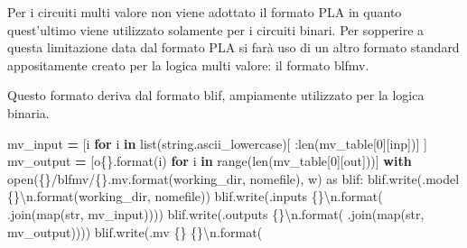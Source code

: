 \documentclass[
  italian,
]{book}
\newenvironment{Shaded}{\begin{snugshade}}{\end{snugshade}}
\newcommand{\BuiltInTok}[1]{#1}
\newcommand{\CharTok}[1]{\textcolor[rgb]{0.31,0.60,0.02}{#1}}
\newcommand{\ControlFlowTok}[1]{\textcolor[rgb]{0.13,0.29,0.53}{\textbf{#1}}}
\newcommand{\DecValTok}[1]{\textcolor[rgb]{0.00,0.00,0.81}{#1}}
\newcommand{\ImportTok}[1]{#1}
\newcommand{\KeywordTok}[1]{\textcolor[rgb]{0.13,0.29,0.53}{\textbf{#1}}}
\newcommand{\NormalTok}[1]{#1}
\newcommand{\OperatorTok}[1]{\textcolor[rgb]{0.81,0.36,0.00}{\textbf{#1}}}
\newcommand{\SpecialCharTok}[1]{\textcolor[rgb]{0.00,0.00,0.00}{#1}}
\newcommand{\StringTok}[1]{\textcolor[rgb]{0.31,0.60,0.02}{#1}}
\begin{document}
Per i circuiti multi valore non viene adottato il formato PLA in quanto quest'ultimo viene utilizzato solamente per i circuiti binari. Per sopperire a questa limitazione data dal formato PLA si farà uso di un altro formato standard appositamente creato per la logica multi valore: il formato blfmv.

Questo formato deriva dal formato blif, ampiamente utilizzato per la logica binaria.

\begin{Shaded}
\begin{Highlighting}[]
\NormalTok{mv\_input }\OperatorTok{=}\NormalTok{ [i }\ControlFlowTok{for}\NormalTok{ i }\KeywordTok{in} \BuiltInTok{list}\NormalTok{(string.ascii\_lowercase)[}
\NormalTok{    :}\BuiltInTok{len}\NormalTok{(mv\_table[}\DecValTok{0}\NormalTok{][}\StringTok{\textquotesingle{}inp\textquotesingle{}}\NormalTok{])]}
\NormalTok{  ]}
\NormalTok{mv\_output }\OperatorTok{=}\NormalTok{ [}\StringTok{\textquotesingle{}o}\SpecialCharTok{\{\}}\StringTok{\textquotesingle{}}\NormalTok{.}\BuiltInTok{format}\NormalTok{(i) }\ControlFlowTok{for}\NormalTok{ i }\KeywordTok{in} \BuiltInTok{range}\NormalTok{(}\BuiltInTok{len}\NormalTok{(mv\_table[}\DecValTok{0}\NormalTok{][}\StringTok{\textquotesingle{}out\textquotesingle{}}\NormalTok{]))]}
\ControlFlowTok{with} \BuiltInTok{open}\NormalTok{(}\StringTok{\textquotesingle{}}\SpecialCharTok{\{\}}\StringTok{/blfmv/}\SpecialCharTok{\{\}}\StringTok{.mv\textquotesingle{}}\NormalTok{.}\BuiltInTok{format}\NormalTok{(working\_dir, nomefile), }\StringTok{\textquotesingle{}w\textquotesingle{}}\NormalTok{) }\ImportTok{as}\NormalTok{ blif:}
\NormalTok{  blif.write(}\StringTok{\textquotesingle{}.model }\SpecialCharTok{\{\}}\CharTok{\textbackslash{}n}\StringTok{\textquotesingle{}}\NormalTok{.}\BuiltInTok{format}\NormalTok{(working\_dir, nomefile))}
\NormalTok{  blif.write(}\StringTok{\textquotesingle{}.inputs }\SpecialCharTok{\{\}}\CharTok{\textbackslash{}n}\StringTok{\textquotesingle{}}\NormalTok{.}\BuiltInTok{format}\NormalTok{(}
      \StringTok{\textquotesingle{} \textquotesingle{}}\NormalTok{.join(}\BuiltInTok{map}\NormalTok{(}\BuiltInTok{str}\NormalTok{, mv\_input))))}
\NormalTok{  blif.write(}\StringTok{\textquotesingle{}.outputs }\SpecialCharTok{\{\}}\CharTok{\textbackslash{}n}\StringTok{\textquotesingle{}}\NormalTok{.}\BuiltInTok{format}\NormalTok{(}
      \StringTok{\textquotesingle{} \textquotesingle{}}\NormalTok{.join(}\BuiltInTok{map}\NormalTok{(}\BuiltInTok{str}\NormalTok{, mv\_output))))}
\NormalTok{  blif.write(}\StringTok{\textquotesingle{}.mv }\SpecialCharTok{\{\}}\StringTok{ }\SpecialCharTok{\{\}}\CharTok{\textbackslash{}n}\StringTok{\textquotesingle{}}\NormalTok{.}\BuiltInTok{format}\NormalTok{(}

\end{Highlighting}
\end{Shaded}
\end{document}
